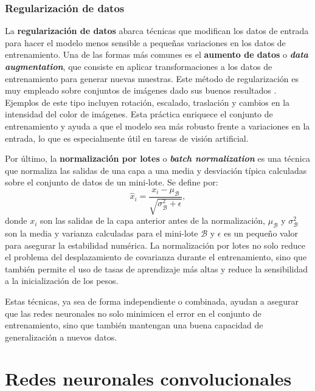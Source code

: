 \subsubsection{Regularización de datos}

La \textbf{regularización de datos} abarca técnicas que modifican los datos de entrada para hacer el modelo menos sensible a pequeñas variaciones en los datos de entrenamiento. Una de las formas más comunes es el \textbf{aumento de datos} o \textbf{\textit{data augmentation}}, que consiste en aplicar transformaciones a los datos de entrenamiento para generar nuevas muestras. Este método de regularización es muy empleado sobre conjuntos de imágenes dado sus buenos resultados \cite{alexnet}. Ejemplos de este tipo incluyen rotación, escalado, traslación y cambios en la intensidad del color de imágenes. Esta práctica enriquece el conjunto de entrenamiento y ayuda a que el modelo sea más robusto frente a variaciones en la entrada, lo que es especialmente útil en tareas de visión artificial.

Por último, la \textbf{normalización por lotes} o \textbf{\textit{batch normalization}} es una técnica que normaliza las salidas de una capa a una media y desviación típica calculadas sobre el conjunto de datos de un mini-lote. Se define por:
\begin{equation}
	\hat{x}_i = \frac{x_i - \mu_{\mathcal{B}}}{\sqrt{\sigma^2_{\mathcal{B}} + \epsilon}},
\end{equation}
donde \(x_i\) son las salidas de la capa anterior antes de la normalización, \(\mu_{\mathcal{B}}\) y \(\sigma^2_{\mathcal{B}}\) son la media y varianza calculadas para el mini-lote \(\mathcal{B}\) y \(\epsilon\) es un pequeño valor para asegurar la estabilidad numérica. La normalización por lotes no solo reduce el problema del desplazamiento de covarianza durante el entrenamiento, sino que también permite el uso de tasas de aprendizaje más altas y reduce la sensibilidad a la inicialización de los pesos.


Estas técnicas, ya sea de forma independiente o combinada, ayudan a asegurar que las redes neuronales no solo minimicen el error en el conjunto de entrenamiento, sino que también mantengan una buena capacidad de generalización a nuevos datos.


\section{Redes neuronales convolucionales}

